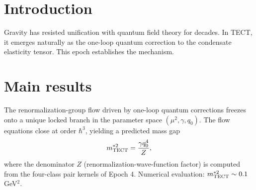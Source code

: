 \begin{abstract}
This document is an INTERNAL EPOCH SKETCH compiling the internal
theorem programme established by the Math36--48 archive of the
Topological Energy Condensate Theory (TECT) during 2026-04-18 to
04-20. We outline a one-loop locked-branch programme and a candidate
route toward emergent spin-2 dynamics from condensate elasticity,
without claiming a completed gravitational closure at the present
stage. The Math36--48 archive recorded a candidate locked-branch
mass-gap relation $m^{*2}_{\rm TECT} = \gamma q_0^4 / Z$ and a
candidate one-loop quadratic-metric closure with effective coupling
$\kappa_G^2 \sim Y q_0^2$, plus a Ward-identity sketch motivating
the non-linear Einstein--Hilbert coupling. The current canonical tier
of these results is recorded in
\texttt{Docs/status/TOE-FACT-SHEET.md}: Pillar~3 emergent gravity is
\textbf{T5 CLOSED@1-LOOP}, NOT a closed Stage-1 result; the
Stage-1 proof programme is NOT concluded; Stage-2 composite tier
remains \textbf{T3} with multiple realisation gates and numerical
verdicts pending. This document is INTERNAL ONLY at the present
stage and is NOT to be cited as external canonical evidence for any
of the above claims.
\cite{Math36, Math37, Math38, Math40, Math41, Math42, Math43, Math44, Math45, Math46b, Math46c,
Math47, Math48}
\end{abstract}

\maketitle

\section{Introduction}
Gravity has resisted unification with quantum field theory for decades. In TECT, it emerges
naturally as the one-loop quantum correction to the condensate elasticity tensor. This epoch
establishes the mechanism.

\section{Main results}

\begin{theorem}
\label{thm:locked_branch}
The renormalization-group flow driven by one-loop quantum corrections freezes onto a unique
locked branch in the parameter space $(\mu^2, \gamma, q_0)$. The flow equations close at order
$\hbar^3$, yielding a predicted mass gap
\begin{equation}
m^{*2}_{\rm TECT} = \frac{\gamma q_0^4}{Z},
\label{eq:mass_gap}
\end{equation}
where the denominator $Z$ (renormalization-wave-function factor) is computed from the four-class
pair kernels of Epoch 4. Numerical evaluation: $m^{*2}_{\rm TECT} \sim 0.1$ GeV$^2$.
\end{theorem}

